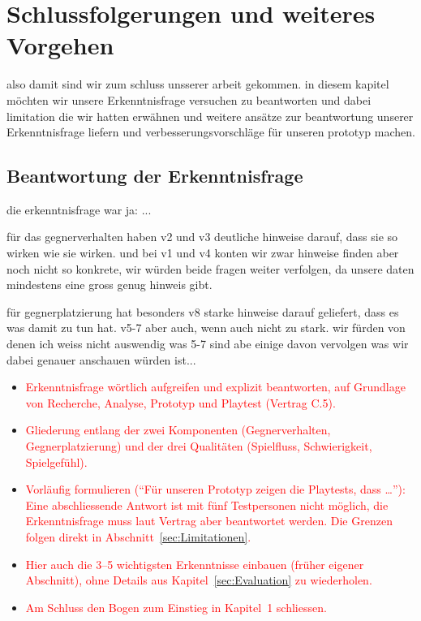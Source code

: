 \documentclass[../Main.tex]{subfiles}
\begin{document}
\section{Schlussfolgerungen und weiteres Vorgehen} \label{sec:Schlussfolgerungen}

also damit sind wir zum schluss unsserer arbeit gekommen. in diesem kapitel möchten wir unsere Erkenntnisfrage versuchen zu beantworten und dabei limitation die wir hatten erwähnen und weitere ansätze zur beantwortung unserer Erkenntnisfrage liefern und verbesserungsvorschläge für unseren prototyp machen.

\subsection{Beantwortung der Erkenntnisfrage} \label{sec:Beantwortung}

die erkenntnisfrage war ja: ...

für das gegnerverhalten haben v2 und v3 deutliche hinweise darauf, dass sie so wirken wie sie wirken. und bei v1 und v4 konten wir zwar hinweise finden aber noch nicht so konkrete, wir würden beide fragen weiter verfolgen, da unsere daten mindestens eine gross genug hinweis gibt.

für gegnerplatzierung hat besonders v8 starke hinweise darauf geliefert, dass es was damit zu tun hat. v5-7 aber auch, wenn auch nicht zu stark. wir fürden von denen ich weiss nicht auswendig was 5-7 sind abe einige davon vervolgen was wir dabei genauer anschauen würden ist...
\begin{itemize}[leftmargin=1.5cm]
    \item \textcolor{red}{Erkenntnisfrage wörtlich aufgreifen und explizit beantworten, auf Grundlage von Recherche, Analyse, Prototyp und Playtest (Vertrag C.5).}
    \item \textcolor{red}{Gliederung entlang der zwei Komponenten (Gegnerverhalten, Gegnerplatzierung) und der drei Qualitäten (Spielfluss, Schwierigkeit, Spielgefühl).}
    \item \textcolor{red}{Vorläufig formulieren (\enquote{Für unseren Prototyp zeigen die Playtests, dass \ldots}): Eine abschliessende Antwort ist mit fünf Testpersonen nicht möglich, die Erkenntnisfrage muss laut Vertrag aber beantwortet werden. Die Grenzen folgen direkt in Abschnitt~\ref{sec:Limitationen}.}
    \item \textcolor{red}{Hier auch die 3--5 wichtigsten Erkenntnisse einbauen (früher eigener Abschnitt), ohne Details aus Kapitel~\ref{sec:Evaluation} zu wiederholen.}
    \item \textcolor{red}{Am Schluss den Bogen zum Einstieg in Kapitel~1 schliessen.}
\end{itemize}
\end{document}
